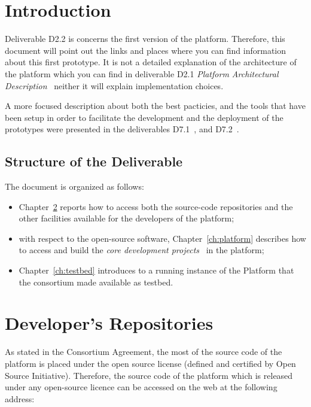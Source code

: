 \documentclass{learnpad}
\begin{document}
\chapter{Introduction}
\label{ch:intro}

Deliverable D2.2 is concerns the first version of the \learnpad platform.
Therefore, this document will point out the links and places where you can find
information about this first prototype.  It is not a detailed explanation of the
architecture of the platform which you can find in deliverable D2.1
\emph{Platform Architectural Description}~\cite{learnpad:D2.1} neither it will 
explain implementation choices.

A more focused description about both the best pacticies, and the tools 
that have been setup in order to facilitate the development and the deployment 
of the \learnpad prototypes were presented in the deliverables 
D7.1~\cite{learnpad:D7.1}, and D7.2~\cite{learnpad:D7.2}.

\section{Structure of the Deliverable}
\label{sec:structure}

The document is organized as follows:
\begin{itemize}
 \item Chapter~\ref{ch:sourcecode} reports how to access both the 
source-code repositories and the other facilities available for the developers 
of the \learnpad platform;
 \item with respect to the open-source software, Chapter~\ref{ch:platform} 
describes how to access and build the \textit{core development 
projects}~\cite{learnpad:D7.1} in the platform;
 \item Chapter~\ref{ch:testbed} introduces to a running instance of the 
\learnpad Platform that the consortium made available as testbed.
\end{itemize}

\chapter{Developer's Repositories}
\label{ch:sourcecode}

As stated in the Consortium Agreement, the most of the source code of the 
platform is placed under the open source license (defined and certified by Open 
Source Initiative). Therefore, the source code of the \learnpad platform which 
is released under any open-source licence can be accessed on the web at the 
following address:
\end{document}
